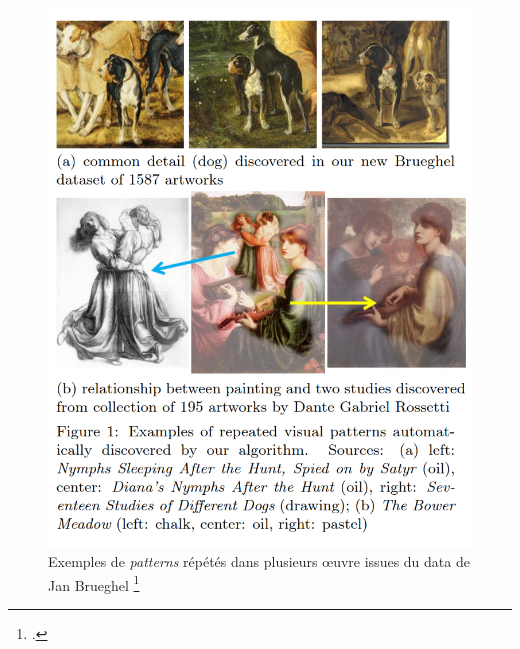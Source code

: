 \begin{figure}[h]
	\centering
	\includegraphics[width=0.7\linewidth]{images/exemples_patterns_enherit.png}
	\caption{Exemples de \textit{patterns} répétés dans plusieurs œuvre issues du data de Jan Brueghel \footcite{shenDiscoveringVisualPatterns2019}}
	\label{fig:exemples_patterns_repetes}
\end{figure}


